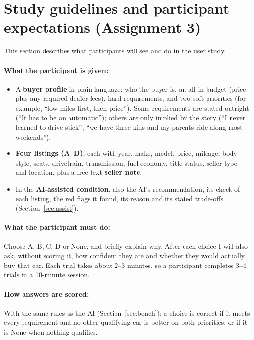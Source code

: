 \documentclass[11pt]{article}
\begin{document}
\section*{Study guidelines and participant expectations (Assignment 3)}\label{sec:guidelines}

This section describes what participants will see and do in the user study.

\paragraph{What the participant is given:}
\begin{itemize}
  \item A \textbf{buyer profile} in plain language: who the buyer is, an all-in budget (price plus
  any required dealer fees), hard requirements, and two soft priorities (for example, ``low miles
  first, then price''). Some requirements are stated outright (``It has to be an automatic'');
  others are only implied by the story (``I never learned to drive stick'', ``we have three kids
  and my parents ride along most weekends'').
  \item \textbf{Four listings (A--D)}, each with year, make, model, price, mileage, body style,
  seats, drivetrain, transmission, fuel economy, title status, seller type and location, plus a
  free-text \textbf{seller note}.
  \item In the \textbf{AI-assisted condition}, also the AI's recommendation, its check of each
  listing, the red flags it found, its reason and its stated trade-offs
  (Section~\ref{sec:assist}).
\end{itemize}

\paragraph{What the participant must do:} Choose A, B, C, D or None, and briefly explain why. After
each choice I will also ask, without scoring it, how confident they are and whether they would
actually buy that car. Each trial takes about 2--3 minutes, so a participant completes 3--4 trials
in a 10-minute session.

\paragraph{How answers are scored:} With the same rules as the AI (Section~\ref{sec:bench}): a
choice is correct if it meets every requirement and no other qualifying car is better on both
priorities, or if it is None when nothing qualifies.
\end{document}
